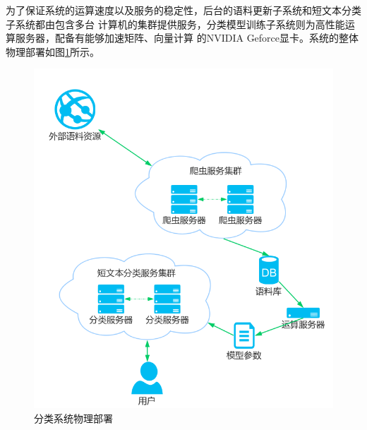 \documentclass{standalone}
\begin{document}
为了保证系统的运算速度以及服务的稳定性，后台的语料更新子系统和短文本分类子系统都由包含多台
计算机的集群提供服务，分类模型训练子系统则为高性能运算服务器，配备有能够加速矩阵、向量计算
的NVIDIA Geforce显卡。系统的整体物理部署如图\ref{system_deployment}所示。
\begin{figure}[h]
    \includegraphics[scale=0.45]{picture/system_deployment.png}
    \caption{分类系统物理部署}
    \label{system_deployment}
\end{figure}
\end{document}
